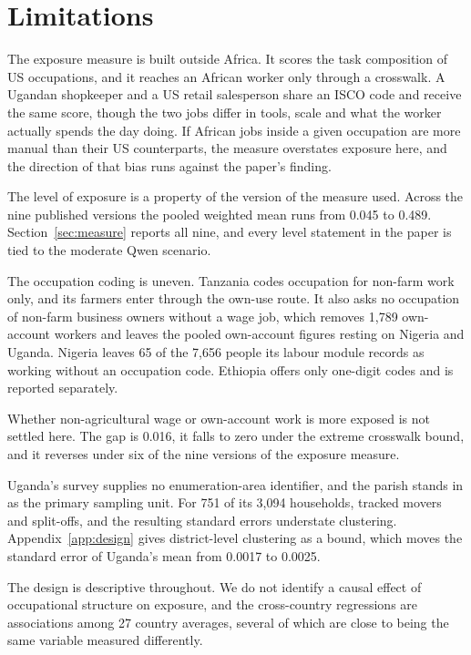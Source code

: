 \section{Limitations}

The exposure measure is built outside Africa. It scores the task composition of
US occupations, and it reaches an African worker only through a crosswalk. A
Ugandan shopkeeper and a US retail salesperson share an ISCO code and receive
the same score, though the two jobs differ in tools, scale and what the worker
actually spends the day doing. If African jobs inside a given occupation are
more manual than their US counterparts, the measure overstates exposure here,
and the direction of that bias runs against the paper's finding.

The level of exposure is a property of the version of the measure used. Across
the nine published versions the pooled weighted mean runs from 0.045 to 0.489.
Section~\ref{sec:measure} reports all nine, and every level statement in the
paper is tied to the moderate Qwen scenario.

The occupation coding is uneven. Tanzania codes occupation for non-farm work
only, and its farmers enter through the own-use route. It also asks no
occupation of non-farm business owners without a wage job, which removes 1,789
own-account workers and leaves the pooled own-account figures resting on Nigeria
and Uganda.
Nigeria leaves 65 of the 7,656 people its labour module records as working
without an occupation code. Ethiopia offers only one-digit codes and is reported
separately.

Whether non-agricultural wage or own-account work is more exposed is not settled
here. The gap is 0.016, it falls to zero under the extreme crosswalk bound, and
it reverses under six of the nine versions of the exposure measure.

Uganda's survey supplies no enumeration-area identifier, and the parish stands
in as the primary sampling unit. For 751 of its 3,094 households, tracked movers
and split-offs, and the resulting standard errors
understate clustering. Appendix~\ref{app:design} gives district-level clustering
as a bound, which moves the standard error of Uganda's mean from 0.0017 to
0.0025.

The design is descriptive throughout. We do not identify a causal effect of
occupational structure on exposure, and the cross-country regressions are
associations among 27 country averages, several of which are close to being the
same variable measured differently.

